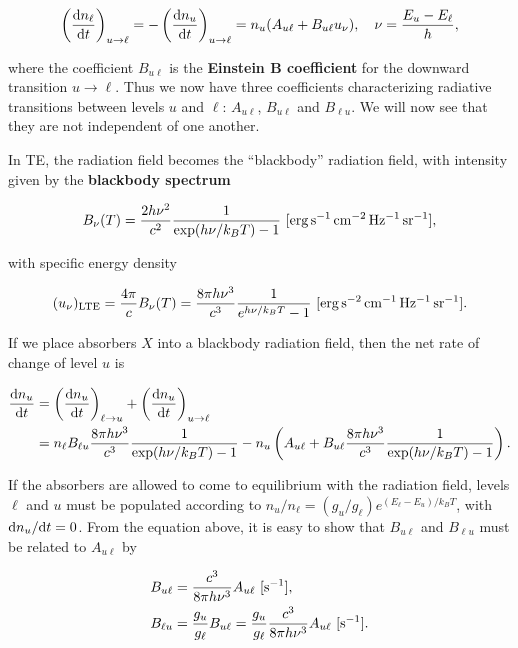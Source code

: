 \documentclass[a4paper,10pt]{article}
\begin{document}
\begin{align*}
    \left(\frac{{\rm d}n_\ell}{{\rm d}t}\right)_{u\rightarrow\ell} = -\left(\frac{{\rm d}n_u}{{\rm d}t}\right)_{u\rightarrow\ell} = n_u(A_{u\ell}+B_{u\ell}u_\nu), ~~~ \nu=\frac{E_u-E_\ell}{h},
\end{align*}

{\noindent}where the coefficient $B_{u\ell}$ is the \textbf{Einstein B coefficient} for the downward transition $u\rightarrow\ell$. Thus we now have three coefficients characterizing radiative transitions between levels $u$ and $\ell$: $A_{u\ell}$, $B_{u\ell}$ and $B_{\ell u}$. We will now see that they are not independent of one another.

{\noindent}In TE, the radiation field becomes the ``blackbody'' radiation field, with intensity given by the \textbf{blackbody spectrum}

\begin{align*}
    B_\nu(T) = \frac{2h\nu^2}{c^2} \frac{1}{\exp(h\nu/k_BT) - 1} ~ [{\rm erg\,s^{-1}\,cm^{-2}\,Hz^{-1}\,sr^{-1}}],
\end{align*}

{\noindent}with specific energy density

\begin{align*}
    (u_\nu)_{\rm LTE} = \frac{4\pi}{c}B_\nu(T) = \frac{8\pi h\nu^3}{c^3}\frac{1}{e^{h\nu/k_BT}-1} ~ [{\rm erg\,s^{-2}\,cm^{-1}\,Hz^{-1}\,sr^{-1}}].
\end{align*}

{\noindent}If we place absorbers $X$ into a blackbody radiation field, then the net rate of change of level $u$ is

\begin{align*}
    \frac{{\rm d}n_u}{{\rm d}t} &= \left(\frac{{\rm d}n_u}{{\rm d}t}\right)_{\ell\rightarrow u} + \left(\frac{{\rm d}n_u}{{\rm d}t}\right)_{u\rightarrow\ell} \\
    &= n_\ell B_{\ell u}\frac{8\pi h\nu^3}{c^3} \frac{1}{\exp(h\nu/k_BT) - 1} - n_u \left(A_{u\ell}+B_{u\ell}\frac{8\pi h\nu^3}{c^3} \frac{1}{\exp(h\nu/k_BT) - 1}\right).
\end{align*}

{\noindent}If the absorbers are allowed to come to equilibrium with the radiation field, levels $\ell$ and $u$ must be populated according to $n_u/n_\ell = (g_u/g_\ell)e^{(E_\ell−E_u)/k_BT}$, with ${\rm d}n_u/{\rm d}t = 0$. From the equation above, it is easy to show that $B_{u\ell}$ and $B_{\ell u}$ must be related to $A_{u\ell}$ by

\begin{align*}
    B_{u\ell} &= \frac{c^3}{8\pi h\nu^3}A_{u\ell} ~ [{\rm s^{-1}}], \\
    B_{\ell u} &= \frac{g_u}{g_\ell}B_{u\ell} = \frac{g_u}{g_\ell}\frac{c^3}{8\pi h\nu^3} A_{u\ell} ~ [{\rm s^{-1}}].
\end{align*}
\end{document}
